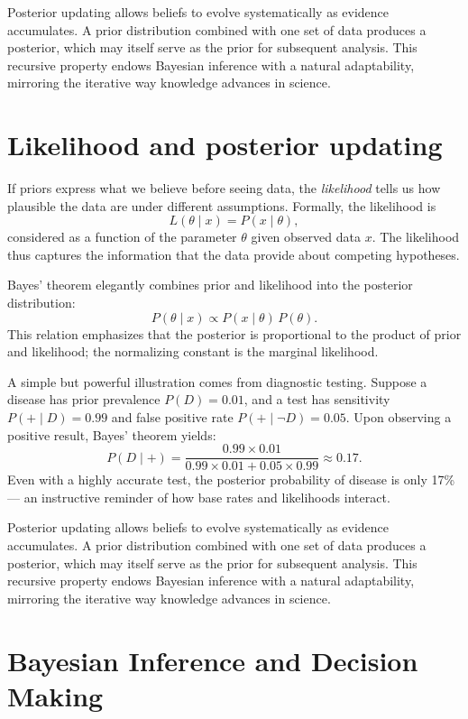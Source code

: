 \documentclass{book}
\begin{document}
Posterior updating allows beliefs to evolve systematically as evidence accumulates. A prior distribution combined with one set of data produces a posterior, which may itself serve as the prior for subsequent analysis. This recursive property endows Bayesian inference with a natural adaptability, mirroring the iterative way knowledge advances in science.

\section{Likelihood and posterior updating}

If priors express what we believe before seeing data, the \textit{likelihood} tells us how plausible the data are under different assumptions. Formally, the likelihood is
\[
L(\theta \mid x) = P(x \mid \theta),
\]
considered as a function of the parameter $\theta$ given observed data $x$. The likelihood thus captures the information that the data provide about competing hypotheses.

Bayes’ theorem elegantly combines prior and likelihood into the posterior distribution:
\[
P(\theta \mid x) \propto P(x \mid \theta) \, P(\theta).
\]
This relation emphasizes that the posterior is proportional to the product of prior and likelihood; the normalizing constant is the marginal likelihood.

A simple but powerful illustration comes from diagnostic testing. Suppose a disease has prior prevalence $P(D) = 0.01$, and a test has sensitivity $P(+ \mid D) = 0.99$ and false positive rate $P(+ \mid \neg D) = 0.05$. Upon observing a positive result, Bayes’ theorem yields:
\[
P(D \mid +) = \frac{0.99 \times 0.01}{0.99 \times 0.01 + 0.05 \times 0.99} \approx 0.17 .
\]
Even with a highly accurate test, the posterior probability of disease is only 17\% --- an instructive reminder of how base rates and likelihoods interact.

Posterior updating allows beliefs to evolve systematically as evidence accumulates. A prior distribution combined with one set of data produces a posterior, which may itself serve as the prior for subsequent analysis. This recursive property endows Bayesian inference with a natural adaptability, mirroring the iterative way knowledge advances in science.

\section{Bayesian Inference and Decision Making}
\end{document}
